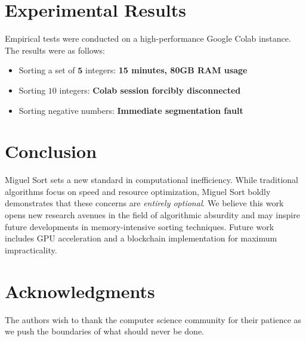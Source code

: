 \documentclass{article}
\begin{document}
\section{Experimental Results}
Empirical tests were conducted on a high-performance Google Colab instance. The results were as follows:
\begin{itemize}
    \item Sorting a set of \(\mathbf{5}\) integers: \textbf{15 minutes, 80GB RAM usage}
    \item Sorting \(10\) integers: \textbf{Colab session forcibly disconnected}
    \item Sorting negative numbers: \textbf{Immediate segmentation fault}
\end{itemize}

\section{Conclusion}
Miguel Sort sets a new standard in computational inefficiency. While traditional algorithms focus on speed and resource optimization, Miguel Sort boldly demonstrates that these concerns are \textit{entirely optional}. We believe this work opens new research avenues in the field of algorithmic absurdity and may inspire future developments in memory-intensive sorting techniques. Future work includes GPU acceleration and a blockchain implementation for maximum impracticality.

\section*{Acknowledgments}
The authors wish to thank the computer science community for their patience as we push the boundaries of what should never be done.
\end{document}
